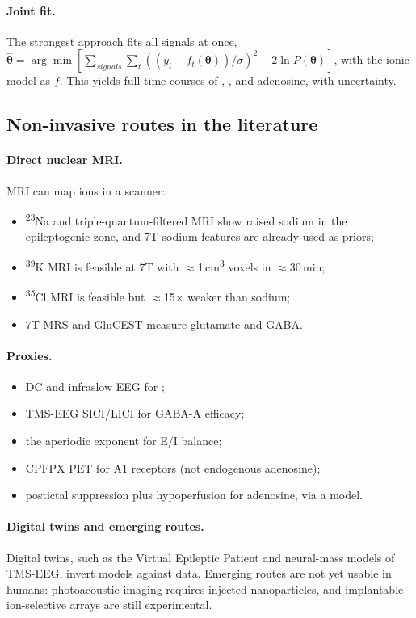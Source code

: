 \paragraph{Joint fit.} The strongest approach fits all signals at once, $\hat{\boldsymbol\theta} = \arg\min[\sum_{signals}\sum_t((y_t-f_t(\boldsymbol\theta))/\sigma)^2 - 2\ln P(\boldsymbol\theta)]$, with the ionic model as $f$. This yields full time courses of \Ko, \Cli, \EGABA{} and adenosine, with uncertainty.

\subsection{Non-invasive routes in the literature}

\paragraph{Direct nuclear MRI.} MRI can map ions in a scanner:
\begin{itemize}
\item \textsuperscript{23}Na and triple-quantum-filtered MRI show raised sodium in the epileptogenic zone, and 7T sodium features are already used as priors;
\item \textsuperscript{39}K MRI is feasible at 7T with $\approx$1\,cm\textsuperscript{3} voxels in $\approx$30\,min;
\item \textsuperscript{35}Cl MRI is feasible but $\approx$15$\times$ weaker than sodium;
\item 7T MRS and GluCEST measure glutamate and GABA.
\end{itemize}

\paragraph{Proxies.}
\begin{itemize}
\item DC and infraslow EEG for \Kp;
\item TMS-EEG SICI/LICI for GABA-A efficacy;
\item the aperiodic exponent for E/I balance;
\item [\textsuperscript{18}F]CPFPX PET for A1 receptors (not endogenous adenosine);
\item postictal suppression plus hypoperfusion for adenosine, via a model.
\end{itemize}

\paragraph{Digital twins and emerging routes.} Digital twins, such as the Virtual Epileptic Patient \cite{jirsa2017,hashemi2020} and neural-mass models of TMS-EEG, invert models against data. Emerging routes are not yet usable in humans: photoacoustic \Kp{} imaging requires injected nanoparticles, and implantable ion-selective arrays are still experimental.

